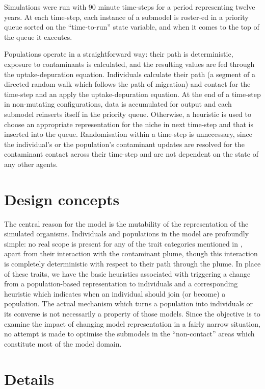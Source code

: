 Simulations were run with 90 minute time-steps for a period representing twelve
years. At each time-step, each instance of a submodel is roster-ed in a
priority queue sorted on the ``time-to-run'' state variable, and when it comes
to the top of the queue it executes.

Populations operate in a straightforward way: their path is deterministic,
exposure to contaminants is calculated, and the resulting values are fed
through the uptake-depuration equation. Individuals calculate their path (a
segment of a directed random walk which follows the path of migration) and
contact for the time-step and an apply the uptake-depuration equation. At the
end of a time-step in non-mutating configurations, data is accumulated for
output and each submodel reinserts itself in the priority queue. Otherwise, a
heuristic is used to choose an appropriate representation for the niche in
next time-step and that is inserted into the queue. Randomisation within a
time-step is unnecessary, since the individual's or the population's
contaminant updates are resolved for the contaminant contact across their
time-step and are not dependent on the state of any other agents.

\section{Design concepts}

The central reason for the model is the mutability of the representation of
the simulated organisms. Individuals and populations in the model are
profoundly simple: no real scope is present for any of the trait categories
mentioned in \citet{Grimm06:1}, apart from their interaction with the
contaminant plume, though this interaction is completely deterministic with
respect to their path through the plume. In place of these traits, we have the
basic heuristics associated with triggering a change from a population-based
representation to individuals and a corresponding heuristic which indicates
when an individual should join (or become) a population. The actual mechanism
which turns a population into individuals or its converse is not necessarily a
property of those models. Since the objective is to examine the impact of
changing model representation in a fairly narrow situation, no attempt is made
to optimise the submodels in the ``non-contact'' areas which constitute most
of the model domain.


\section{Details}

